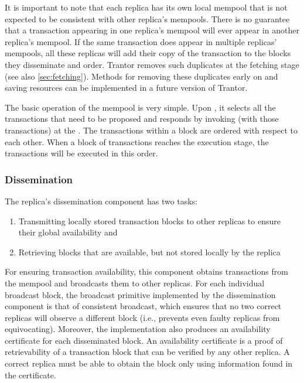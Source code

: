 \documentclass{article}
\begin{document}
It is important to note that each replica has its own local mempool
that is not expected to be consistent with other replica’s mempools.
There is no guarantee that a transaction appearing in one replica’s mempool will ever appear in another replica’s mempool.
If the same transaction does appear in multiple replicas’ mempools,
all these replicas will add their copy of the transaction to the blocks they disseminate and order.
Trantor removes such duplicates at the fetching stage (see also \cref{sec:fetching}).
Methods for removing these duplicates early on and saving resources can be implemented in a future version of Trantor.

The basic operation of the mempool is very simple.
Upon ,
it selects all the transactions that need to be proposed and responds by invoking  (with those transactions) at the .
The transactions within a block are ordered with respect to each other.
When a block of transactions reaches the execution stage, the transactions will be executed in this order.

\subsubsection{Dissemination}

The replica’s dissemination component has two tasks:
\begin{enumerate}
    \item Transmitting locally stored transaction blocks to other replicas to ensure their global availability and
    \item Retrieving blocks that are available, but not stored locally by the replica
\end{enumerate}


For ensuring transaction availability, this component obtains transactions from the mempool and broadcasts them to other replicas.
For each individual broadcast block,
the broadcast primitive implemented by the dissemination component is that of consistent broadcast,
which ensures that no two correct replicas will observe a different block
(i.e., prevents even faulty replicas from equivocating).
Moreover, the implementation also produces an availability certificate for each disseminated block.
An availability certificate is a proof of retrievability of a transaction block that can be verified by any other replica.
A correct replica must be able to obtain the block only using information found in the certificate.
\end{document}
